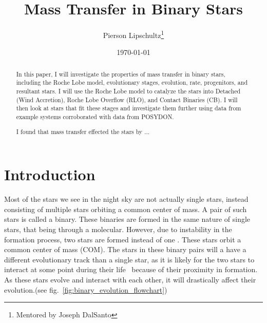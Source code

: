\documentclass[12pt, a4paper]{article}
\title{Mass Transfer in Binary Stars}
\author{Pierson Lipschultz\thanks{Mentored by Joseph DalSanto}}
\date{\today}
\begin{document}
\maketitle
\begin{abstract}
    \normalsize
    In this paper, I will investigate the properties of mass transfer in binary stars, including the Roche Lobe model, evolutionary stages, evolution, rate, progenitors, and resultant stars. I will use the Roche Lobe model to catalyze the stars into Detached (Wind Accretion), Roche Lobe Overflow (RLO), and Contact Binaries (CB). I will then look at stars that fit these stages and investigate them further using data from example systems corroborated with data from POSYDON.

    I found that mass transfer effected the stars by ... 
\end{abstract}

\section{\centering Introduction} %

    Most of the stars we see in the night sky are not actually single stars, instead consisting of multiple stars orbiting a common center of mass. A pair of such stars is called a binary. These binaries are formed in the same nature of single stars, that being through a molecular. However, due to instability in the formation process, two stars are formed instead of one \cite{Offner_2016}. These stars orbit a common center of mass (COM). The stars in these binary pairs will a have a different evolutionary track than a single star, as it is likely for the two stars to interact at some point during their life~\cite{Fabry_2025} because of their proximity in formation. As these stars evolve and interact with each other, it will drastically affect their evolution.(see fig.~\ref{fig:binary_evolution_flowchart})
\end{document}

